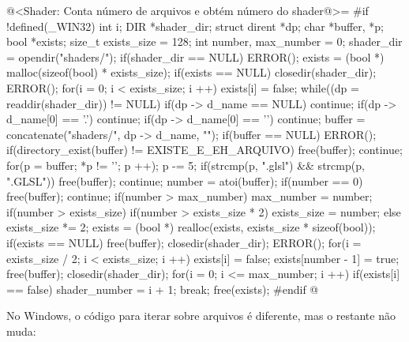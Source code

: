 {\iniciocodigo
@<Shader: Conta número de arquivos e obtém número do shader@>=
#if !defined(_WIN32)
{
  int i;
  DIR *shader_dir;
  struct dirent *dp;
  char *buffer, *p;
  bool *exists;
  size_t exists_size = 128;
  int number, max_number = 0;
  shader_dir = opendir("shaders/");
  if(shader_dir == NULL)
    ERROR();
  exists = (bool *) malloc(sizeof(bool) * exists_size);
  if(exists == NULL){
    closedir(shader_dir);
    ERROR();
  }
  for(i = 0; i < exists_size; i ++)
    exists[i] = false;
  while((dp = readdir(shader_dir)) != NULL){
    if(dp -> d_name == NULL) continue;
    if(dp -> d_name[0] == '.') continue;
    if(dp -> d_name[0] == '\0') continue;
    buffer = concatenate("shaders/", dp -> d_name, "");
    if(buffer == NULL) ERROR();
    if(directory_exist(buffer) != EXISTE_E_EH_ARQUIVO){
      free(buffer);
      continue;
    }
    for(p = buffer; *p != '\0'; p ++);
    p -= 5;
    if(strcmp(p, ".glsl") && strcmp(p, ".GLSL")){
      free(buffer);
      continue;
    }
    number = atoi(buffer);
    if(number == 0){
      free(buffer);
      continue;
    }
    if(number > max_number)
      max_number = number;
    if(number > exists_size){
      if(number > exists_size * 2)
        exists_size = number;
      else
        exists_size *= 2;
      exists = (bool *) realloc(exists, exists_size * sizeof(bool));
      if(exists == NULL){
        free(buffer);
        closedir(shader_dir);
        ERROR();
      }
      for(i = exists_size / 2; i < exists_size; i ++)
        exists[i] = false;
    }
    exists[number - 1] = true;
    free(buffer);
  }
  closedir(shader_dir);
  for(i = 0; i <= max_number; i ++)
    if(exists[i] == false){
      shader_number = i + 1;
      break;
    }
  free(exists);
}
#endif
@
\fimcodigo

No Windows, o código para iterar sobre arquivos é diferente, mas o
restante não muda:

}
